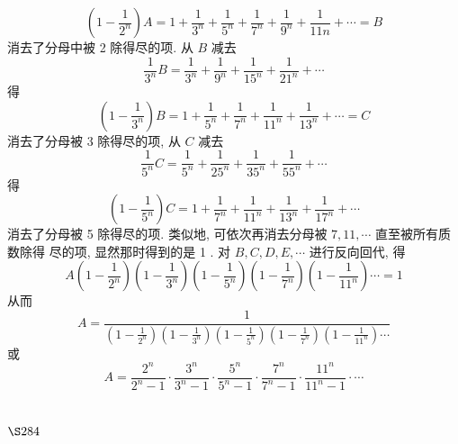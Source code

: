 \[
\left(1-\frac{1}{2^n}\right) A=1+\frac{1}{3^n}+\frac{1}{5^n}+\frac{1}{7^n}+\frac{1}{9^n}+\frac{1}{11 n}+\cdots=B
\]
消去了分母中被 2 除得尽的项. 从 $B$ 减去
\[
\frac{1}{3^{n}} B=\frac{1}{3^{n}}+\frac{1}{9^{n}}+\frac{1}{15^{n}}+\frac{1}{21^{n}}+\cdots
\]
得
\[
\left(1-\frac{1}{3^{n}}\right) B=1+\frac{1}{5^{n}}+\frac{1}{7^{n}}+\frac{1}{11^{n}}+\frac{1}{13^{n}}+\cdots=C
\]
消去了分母被 3 除得尽的项, 从 $C$ 减去
\[
\frac{1}{5^{n}} C=\frac{1}{5^{n}}+\frac{1}{25^{n}}+\frac{1}{35^{n}}+\frac{1}{55^{n}}+\cdots
\]
得
\[
\left(1-\frac{1}{5^{n}}\right) C=1+\frac{1}{7^{n}}+\frac{1}{11^{n}}+\frac{1}{13^{n}}+\frac{1}{17^{n}}+\cdots
\]
消去了分母被 5 除得尽的项. 类似地, 可依次再消去分母被 $7,11, \cdots$ 直至被所有质数除得 尽的项, 显然那时得到的是 1 . 对 $B, C, D, E, \cdots$ 进行反向回代, 得
\[
A\left(1-\frac{1}{2^{n}}\right)\left(1-\frac{1}{3^{n}}\right)\left(1-\frac{1}{5^{n}}\right)\left(1-\frac{1}{7^{n}}\right)\left(1-\frac{1}{11^{n}}\right) \cdots=1
\]
从而
\[
A=\frac{1}{\left(1-\frac{1}{2^{n}}\right)\left(1-\frac{1}{3^{n}}\right)\left(1-\frac{1}{5^{n}}\right)\left(1-\frac{1}{7^{n}}\right)\left(1-\frac{1}{11^{n}}\right) \cdots}
\]
或
\[
A=\frac{2^{n}}{2^{n}-1} \cdot \frac{3^{n}}{3^{n}-1} \cdot \frac{5^{n}}{5^{n}-1} \cdot \frac{7^{n}}{7^{n}-1} \cdot \frac{11^{n}}{11^{n}-1} \cdot \cdots
\]
\section{$\S 284$}

